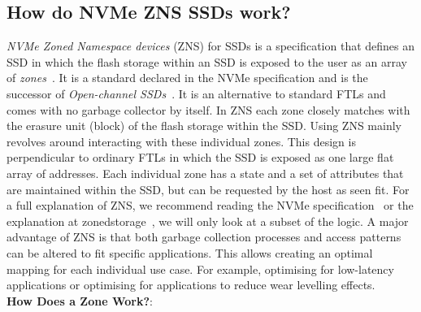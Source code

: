 \subsection{How do NVMe ZNS SSDs work?}
\label{sec:znsworkings}
\textit{NVMe Zoned Namespace devices} (ZNS) for SSDs is a specification that defines an SSD in which the flash storage within an SSD is exposed to the user as an array of \textit{zones}~\cite{NVMeSpec,bjorling2021zns}. It is a standard declared in the NVMe specification and is the successor of \textit{Open-channel SSDs}~\cite{bjorling2019open}. It is an alternative to standard FTLs and comes with no garbage collector by itself. In ZNS each zone closely matches with the erasure unit (block) of the flash storage within the SSD. Using ZNS mainly revolves around interacting with these individual zones. This design is perpendicular to ordinary FTLs in which the SSD is exposed as one large flat array of addresses. Each individual zone has a state and a set of attributes that are maintained within the SSD, but can be requested by the host as seen fit. For a full explanation of ZNS, we recommend reading the NVMe specification~\cite{NVMeSpec} or the explanation at zonedstorage~\cite{zonedstorage}, we will only look at a subset of the logic. A major advantage of ZNS is that both garbage collection processes and access patterns can be altered to fit specific applications. This allows creating an optimal mapping for each individual use case. For example, optimising for low-latency applications or optimising for applications to reduce wear levelling effects.\\
\textbf{How Does a Zone Work?}:\\
